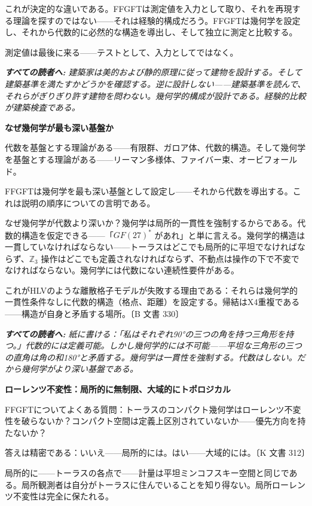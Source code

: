 \documentclass[11pt,openany]{book}
\newenvironment{laierspur}{%
  \par\vspace{4pt}%
  \noindent\small\itshape\color{blue!60!black}%
  \textbf{すべての読者へ:}\enspace\ignorespaces}{%
  \par\vspace{4pt}\normalsize\normalfont\normalcolor}
\begin{document}
これが決定的な違いである。FFGFTは測定値を入力として取り、それを再現する理論を探すのではない——それは経験的構成だろう。FFGFTは幾何学を設定し、それから代数的に必然的な構造を導出し、そして独立に測定と比較する。

測定値は最後に来る——テストとして、入力としてではなく。

\begin{laierspur}
建築家は美的および静的原理に従って建物を設計する。そして建築基準を満たすかどうかを確認する。逆に設計しない——建築基準を読んで、それらがぎりぎり許す建物を問わない。幾何学的構成が設計である。経験的比較が建築検査である。
\end{laierspur}

\textbf{なぜ幾何学が最も深い基盤か}

代数を基盤とする理論がある——有限群、ガロア体、代数的構造。そして幾何学を基盤とする理論がある——リーマン多様体、ファイバー束、オービフォールド。

FFGFTは幾何学を最も深い基盤として設定し——それから代数を導出する。これは説明の順序についての言明である。

なぜ幾何学が代数より深いか？幾何学は局所的一貫性を強制するからである。代数的構造を仮定できる——「$GF(27)^*$ があれ」と単に言える。幾何学的構造は一貫していなければならない——トーラスはどこでも局所的に平坦でなければならず、$\mathbb{Z}_3$ 操作はどこでも定義されなければならず、不動点は操作の下で不変でなければならない。幾何学には代数にない連続性要件がある。

これがHLVのような離散格子モデルが失敗する理由である：それらは幾何学的一貫性条件なしに代数的構造（格点、距離）を設定する。帰結はX4重複である——構造が自身と矛盾する場所。〔B 文書 330〕

\begin{laierspur}
紙に書ける：「私はそれぞれ90°の三つの角を持つ三角形を持つ。」代数的には定義可能。しかし幾何学的には不可能——平坦な三角形の三つの直角は角の和180°と矛盾する。幾何学は一貫性を強制する。代数はしない。だから幾何学がより深い基盤である。
\end{laierspur}

\textbf{ローレンツ不変性：局所的に無制限、大域的にトポロジカル}

FFGFTについてよくある質問：トーラスのコンパクト幾何学はローレンツ不変性を破らないか？コンパクト空間は定義上区別されていないか——優先方向を持たないか？

答えは精密である：いいえ——局所的には。はい——大域的には。〔K 文書 312〕

局所的に——トーラスの各点で——計量は平坦ミンコフスキー空間と同じである。局所観測者は自分がトーラスに住んでいることを知り得ない。局所ローレンツ不変性は完全に保たれる。
\end{document}
